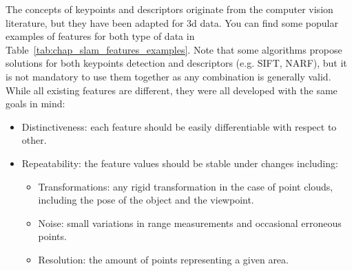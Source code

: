 The concepts of keypoints and descriptors originate from the computer vision literature, but they have been adapted for \gls*{3d} data. You can find some popular examples of features for both type of data in Table~\ref{tab:chap_slam_features_examples}. Note that some algorithms propose solutions for both keypoints detection and descriptors (e.g. SIFT, NARF), but it is not mandatory to use them together as any combination is generally valid. While all existing features are different, they were all developed with the same goals in mind:
\begin{itemize}[label=$\bullet$,noitemsep,topsep=0pt]
    \item Distinctiveness: each feature should be easily differentiable with respect to other.
    \item Repeatability: the feature values should be stable under changes including:
        \begin{itemize}[label=$\circ$,noitemsep,topsep=0pt]
            \item Transformations: any rigid transformation in the case of point clouds, including the pose of the object and the viewpoint.
            \item Noise: small variations in range measurements and occasional erroneous points.
            \item Resolution: the amount of points representing a given area.
        \end{itemize}
\end{itemize}

